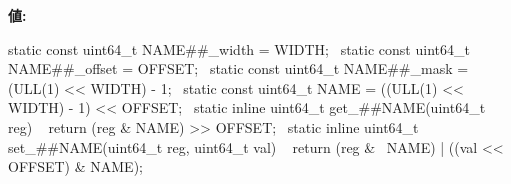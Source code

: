 \label{sinicreg_8hh_ab6ae16561ac71ad7de115787fd394586}
{\bfseries 値:}
\begin{DoxyCode}
static const uint64_t NAME##_width = WIDTH; \
        static const uint64_t NAME##_offset = OFFSET; \
        static const uint64_t NAME##_mask = (ULL(1) << WIDTH) - 1; \
        static const uint64_t NAME = ((ULL(1) << WIDTH) - 1) << OFFSET; \
        static inline uint64_t get_##NAME(uint64_t reg) \
        { return (reg & NAME) >> OFFSET; } \
        static inline uint64_t set_##NAME(uint64_t reg, uint64_t val) \
        { return (reg & ~NAME) | ((val << OFFSET) & NAME); }
\end{DoxyCode}
